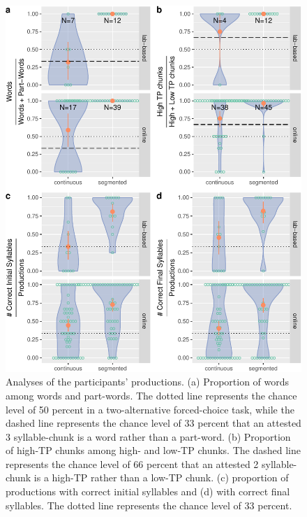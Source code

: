 \documentclass[
]{article}
\begin{document}
\begin{figure}

{\centering \includegraphics[width=0.8\linewidth]{segmentation_recall_combined_for_revision4_files/figure-latex/recall-w-pw-chunks-positions-plot-1} 

}

\caption{Analyses of the participants' productions. (a) Proportion of words among words and part-words. The dotted line represents the chance level of 50 percent in a two-alternative forced-choice task, while the dashed line represents the chance level of 33 percent that an attested 3 syllable-chunk is a word rather than a part-word. (b) Proportion of high-TP chunks among high- and low-TP chunks. The dashed line represents the chance level of 66 percent that an attested 2 syllable-chunk is a high-TP rather than a low-TP chunk. (c) proportion of productions with correct initial syllables and (d) with correct final syllables. The dotted line represents the chance level of 33 percent.}\label{fig:recall-w-pw-chunks-positions-plot}
\end{figure}
\end{document}
